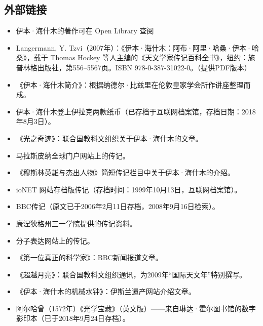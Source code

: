 \subsection{外部链接}
\begin{itemize}
\item 伊本·海什木的著作可在 Open Library 查阅
\item Langermann, Y. Tzvi（2007年）：《伊本·海什木：阿布·阿里·哈桑·伊本·哈桑》，载于 Thomas Hockey 等人主编的《天文学家传记百科全书》，纽约：施普林格出版社，第556–5567页。ISBN 978-0-387-31022-0。（提供PDF版本）
\item 《伊本·海什木简介》：根据纳德尔·比兹里在伦敦皇家学会所作讲座整理而成。
\item 伊本·海什木登上伊拉克两款纸币（已存档于互联网档案馆，存档日期：2018年8月3日）。
\item 《光之奇迹》：联合国教科文组织关于伊本·海什木的文章。
\item 马拉斯皮纳全球门户网站上的传记。
\item 《穆斯林英雄与杰出人物》简短传记栏目中关于伊本·海什木的介绍。
\item ioNET 网站存档版传记（存档时间：1999年10月13日，互联网档案馆）。
\item BBC传记（原文已于2006年2月11日存档，2008年9月16日检索）。
\item 康涅狄格州三一学院提供的传记资料。
\item 分子表达网站上的传记。
\item 《第一位真正的科学家》：BBC新闻报道文章。
\item 《超越月亮》：联合国教科文组织通讯，为2009年“国际天文年”特别撰写。
\item 《伊本·海什木的机械水钟》：伊斯兰遗产网站介绍文章。
\item 阿尔哈曾（1572年）《光学宝藏》（英文版）——来自琳达·霍尔图书馆的数字影印本（已于2018年9月24日存档）。
\end{itemize}

